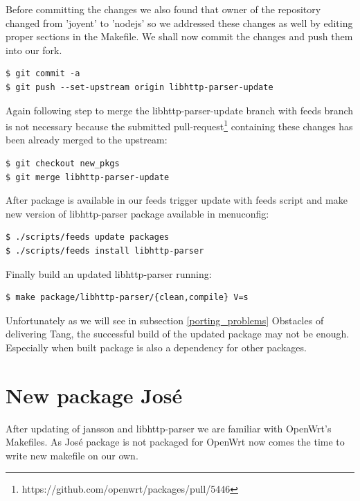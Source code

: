 Before committing the changes we also found that owner of the repository changed from 'joyent' to 'nodejs' so we addressed these changes as well by editing proper sections in the Makefile.
We shall now commit the changes and push them into our fork.
\begin{lstlisting}[columns=fixed,basicstyle=\ttfamily\footnotesize,tabsize=4,backgroundcolor=\color{yellow!10}]
$ git commit -a
$ git push --set-upstream origin libhttp-parser-update
\end{lstlisting}
Again following step to merge the libhttp-parser-update branch with feeds branch is not necessary because the submitted pull-request\footnote{https://github.com/openwrt/packages/pull/5446} containing these changes has been already merged to the upstream:
\begin{lstlisting}[columns=fixed,basicstyle=\ttfamily\footnotesize,tabsize=4,backgroundcolor=\color{yellow!10}]
$ git checkout new_pkgs
$ git merge libhttp-parser-update
\end{lstlisting}
After package is available in our feeds trigger update with feeds script and make new version of libhttp-parser package available in menuconfig:
\begin{lstlisting}[columns=fixed,basicstyle=\ttfamily\footnotesize,tabsize=4,backgroundcolor=\color{yellow!10}]
$ ./scripts/feeds update packages
$ ./scripts/feeds install libhttp-parser
\end{lstlisting}
Finally build an updated libhttp-parser running:
\begin{lstlisting}[columns=fixed,basicstyle=\ttfamily\footnotesize,tabsize=4,backgroundcolor=\color{yellow!10}]
$ make package/libhttp-parser/{clean,compile} V=s
\end{lstlisting}
Unfortunately as we will see in subsection \ref{porting_problems} Obstacles of delivering Tang, the successful build of the updated package may not be enough.
Especially when built package is also a dependency for other packages.



\section{New package José}

After updating of jansson and libhttp-parser we are familiar with OpenWrt's Makefiles.
As José package is not packaged for OpenWrt now comes the time to write new makefile on our own.

